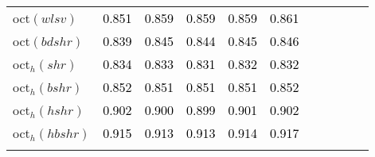 \begin{tabular}[t]{l|>{}cccc>{}c|ccccc}
oct$(wlsv)$ & \textcolor{black}{0.851} & \textcolor{black}{0.859} & \textcolor{black}{0.859} & \textcolor{black}{0.859} & \textcolor{black}{0.861} &  &  &  &  & \\
oct$(bdshr)$ & \textcolor{black}{0.839} & \textcolor{black}{0.845} & \textcolor{black}{0.844} & \textcolor{black}{0.845} & \textcolor{black}{0.846} &  &  &  &  & \\
oct$_h(shr)$ & \textcolor{black}{0.834} & \textcolor{black}{0.833} & \textcolor{black}{0.831} & \textcolor{black}{0.832} & \textcolor{black}{0.832} &  &  &  &  & \\
oct$_h(bshr)$ & \textcolor{black}{0.852} & \textcolor{black}{0.851} & \textcolor{black}{0.851} & \textcolor{black}{0.851} & \textcolor{black}{0.852} &  &  &  &  & \\
oct$_h(hshr)$ & \textcolor{black}{0.902} & \textcolor{black}{0.900} & \textcolor{black}{0.899} & \textcolor{black}{0.901} & \textcolor{black}{0.902} &  &  &  &  & \\
oct$_h(hbshr)$ & \textcolor{black}{0.915} & \textcolor{black}{0.913} & \textcolor{black}{0.913} & \textcolor{black}{0.914} & \textcolor{black}{0.917} &  &  &  &  & \\
\bottomrule
{}\\
\end{tabular}
